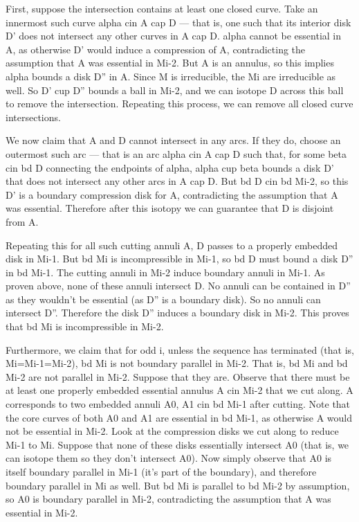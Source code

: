 First, suppose the intersection contains at least one closed curve. Take an
innermost such curve alpha cin A cap D --- that is, one such that its interior
disk D' does not intersect any other curves in A cap D.  alpha cannot be
essential in A, as otherwise D' would induce a compression of A, contradicting
the assumption that A was essential in Mi-2.  But A is an annulus, so this
implies alpha bounds a disk D'' in A. Since M is irreducible, the Mi are
irreducible as well.  So D' cup D'' bounds a ball in Mi-2, and we can isotope
D across this ball to remove the intersection.  Repeating this process, we can
remove all closed curve intersections.

We now claim that A and D cannot intersect in any arcs. If they do, choose an
outermost such arc --- that is an arc alpha cin A cap D such that, for some
beta cin bd D connecting the endpoints of alpha, alpha cup beta bounds a disk
D' that does not intersect any other arcs in A cap D. But bd D cin bd Mi-2, so
this D' is a boundary compression disk for A, contradicting the assumption that
A was essential. Therefore after this isotopy we can guarantee that D is
disjoint from A.

Repeating this for all such cutting annuli A, D passes to a properly embedded
disk in Mi-1. But bd Mi is incompressible in Mi-1, so bd D must bound a disk
D'' in bd Mi-1. The cutting annuli in Mi-2 induce boundary annuli in Mi-1. As
proven above, none of these annuli intersect D. No annuli can be contained in
D'' as they wouldn't be essential (as D'' is a boundary disk). So no annuli can
intersect D''. Therefore the disk D'' induces a boundary disk in Mi-2. This
proves that bd Mi is incompressible in Mi-2.

Furthermore, we claim that for odd i, unless the sequence has terminated (that
is, Mi=Mi-1=Mi-2), bd Mi is not boundary parallel in Mi-2. That is, bd Mi and
bd Mi-2 are not parallel in Mi-2. Suppose that they are. Observe that there
must be at least one properly embedded essential annulus A cin Mi-2 that we cut
along. A corresponds to two embedded annuli A0, A1 cin bd Mi-1 after cutting.
Note that the core curves of both A0 and A1 are essential in bd Mi-1, as
otherwise A would not be essential in Mi-2. Look at the compression disks we
cut along to reduce Mi-1 to Mi. Suppose that none of these disks essentially
intersect A0 (that is, we can isotope them so they don't intersect A0). Now
simply observe that A0 is itself boundary parallel in Mi-1 (it's part of the
boundary), and therefore boundary parallel in Mi as well. But bd Mi is parallel
to bd Mi-2 by assumption, so A0 is boundary parallel in Mi-2, contradicting the
assumption that A was essential in Mi-2.

